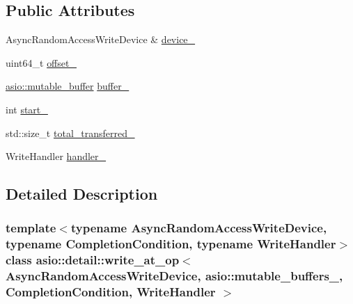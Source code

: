 \subsection*{Public Attributes}
\begin{DoxyCompactItemize}
\item 
Async\+Random\+Access\+Write\+Device \& \hyperlink{classasio_1_1detail_1_1write__at__op_3_01_async_random_access_write_device_00_01_01_01_01_01_01_9c63ca7e3422e806874cb49cd5be5156_a59151894594dccd95071d7c3f9f0d6f7}{device\+\_\+}
\item 
uint64\+\_\+t \hyperlink{classasio_1_1detail_1_1write__at__op_3_01_async_random_access_write_device_00_01_01_01_01_01_01_9c63ca7e3422e806874cb49cd5be5156_a0a16c76a5234af86fa180f3fa4045164}{offset\+\_\+}
\item 
\hyperlink{classasio_1_1mutable__buffer}{asio\+::mutable\+\_\+buffer} \hyperlink{classasio_1_1detail_1_1write__at__op_3_01_async_random_access_write_device_00_01_01_01_01_01_01_9c63ca7e3422e806874cb49cd5be5156_ad25b382494cc5aab90a7424e72ea09f7}{buffer\+\_\+}
\item 
int \hyperlink{classasio_1_1detail_1_1write__at__op_3_01_async_random_access_write_device_00_01_01_01_01_01_01_9c63ca7e3422e806874cb49cd5be5156_a19f19915f7aa362f777f26facddcd022}{start\+\_\+}
\item 
std\+::size\+\_\+t \hyperlink{classasio_1_1detail_1_1write__at__op_3_01_async_random_access_write_device_00_01_01_01_01_01_01_9c63ca7e3422e806874cb49cd5be5156_a0817b07edb1479593f1814b468d07640}{total\+\_\+transferred\+\_\+}
\item 
Write\+Handler \hyperlink{classasio_1_1detail_1_1write__at__op_3_01_async_random_access_write_device_00_01_01_01_01_01_01_9c63ca7e3422e806874cb49cd5be5156_a138d294bd1ee398913e65e9745251f3b}{handler\+\_\+}
\end{DoxyCompactItemize}


\subsection{Detailed Description}
\subsubsection*{template$<$typename Async\+Random\+Access\+Write\+Device, typename Completion\+Condition, typename Write\+Handler$>$class asio\+::detail\+::write\+\_\+at\+\_\+op$<$ Async\+Random\+Access\+Write\+Device,                           asio\+::mutable\+\_\+buffers\+\_, Completion\+Condition, Write\+Handler $>$}



